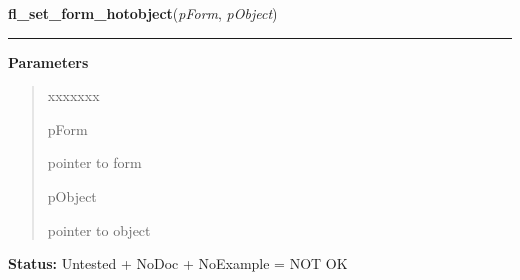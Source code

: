 \hspace{.8\funcindent}\begin{boxedminipage}{\funcwidth}

    \raggedright \textbf{fl\_set\_form\_hotobject}(\textit{pForm}, \textit{pObject})

    \vspace{-1.5ex}

    \rule{\textwidth}{0.5\fboxrule}
\setlength{\parskip}{2ex}
\setlength{\parskip}{1ex}
      \textbf{Parameters}
      \vspace{-1ex}

      \begin{quote}
        \begin{Ventry}{xxxxxxx}

          \item[pForm]

          pointer to form

          \item[pObject]

          pointer to object

        \end{Ventry}

      \end{quote}

\textbf{Status:} Untested + NoDoc + NoExample = NOT OK



    \end{boxedminipage}

    \label{xformslib:library:fl_set_form_minsize}

    \vspace{0.5ex}

